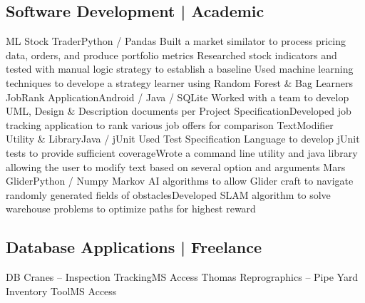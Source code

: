 \subsection{Software Development | Academic}
%
\justifiedsubsection%
{ML Stock Trader}{Python / Pandas}
%
\workitems%
{Built a market similator to process pricing data, orders, and produce portfolio metrics}
{Researched stock indicators and tested with manual logic strategy to establish a baseline}
{Used machine learning techniques to develope a strategy learner using Random Forest \& Bag Learners}
%
\justifiedsubsection%
{JobRank Application}{Android / Java / SQLite}
%
\workitemstwo%
{Worked with a team to develop UML, Design \& Description documents per Project Specification}{Developed job tracking application to rank various job offers for comparison}
%
\justifiedsubsection%
{TextModifier Utility \& Library}{Java / jUnit}
%
\workitemstwo%
{Used Test Specification Language to develop jUnit tests to provide sufficient coverage}{Wrote a command line utility and java library allowing the user to modify text based on several option and arguments}
%
\justifiedsubsection%
{Mars Glider}{Python / Numpy}
%
\workitemstwo%
{Markov AI algorithms to allow Glider craft to navigate randomly generated fields of obstacles}{Developed SLAM algorithm to solve warehouse problems to optimize paths for highest reward}
%
%
%
\subsection{Database Applications | Freelance}
%
\justifiedsubsection%
{DB Cranes -- Inspection Tracking}{MS Access}
%
\justifiedsubsection%
{Thomas Reprographics -- Pipe Yard Inventory Tool}{MS Access}

